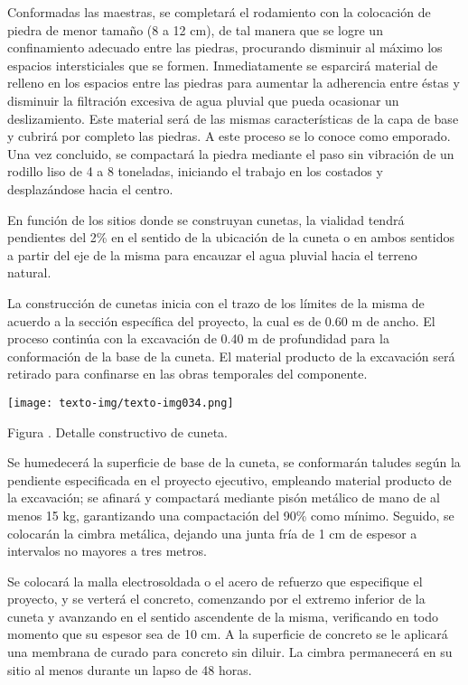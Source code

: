 \documentclass{article}
\newcounter{Figura}
\renewcommand\theFigura{\arabic{Figura}}
\begin{document}
\bigskip

Conformadas las maestras, se completará el rodamiento con la colocación de piedra de menor tamaño (8 a 12 cm), de tal manera que se logre un confinamiento adecuado entre las piedras, procurando disminuir al máximo los espacios intersticiales que se formen. Inmediatamente se esparcirá material de relleno en los espacios entre las piedras para aumentar la adherencia entre éstas y disminuir la filtración excesiva de agua pluvial que pueda ocasionar un deslizamiento. Este material será de las mismas características de la capa de base y cubrirá por completo las piedras. A este proceso se lo conoce como emporado. Una vez concluido, se compactará la piedra mediante el paso sin vibración de un rodillo liso de 4 a 8 toneladas, iniciando el trabajo en los costados y desplazándose hacia el centro. 


\bigskip

En función de los sitios donde se construyan cunetas, la vialidad tendrá pendientes del 2\% en el sentido de la ubicación de la cuneta o en ambos sentidos a partir del eje de la misma para encauzar el agua pluvial hacia el terreno natural. 


\bigskip

La construcción de cunetas inicia con el trazo de los límites de la misma de acuerdo a la sección específica del proyecto, la cual es de 0.60 m de ancho. El proceso continúa con la excavación de 0.40 m de profundidad para la conformación de la base de la cuneta. El material producto de la excavación será retirado para confinarse en las obras temporales del componente.


\bigskip

 \texttt{[image: texto-img/texto-img034.png]} 

Figura \stepcounter{Figura}{\theFigura}. Detalle constructivo de cuneta.


\bigskip

Se humedecerá la superficie de base de la cuneta, se conformarán taludes según la pendiente especificada en el proyecto ejecutivo, empleando material producto de la excavación; se afinará y compactará mediante pisón metálico de mano de al menos 15 kg, garantizando una compactación del 90\% como mínimo. Seguido, se colocarán la cimbra metálica, dejando una junta fría de 1 cm de espesor a intervalos no mayores a tres metros.


\bigskip

Se colocará la malla electrosoldada o el acero de refuerzo que especifique el proyecto, y se verterá el concreto, comenzando por el extremo inferior de la cuneta y avanzando en el sentido ascendente de la misma, verificando en todo momento que su espesor sea de 10 cm. A la superficie de concreto se le aplicará una membrana de curado para concreto sin diluir. La cimbra permanecerá en su sitio al menos durante un lapso de 48 horas.
\end{document}
